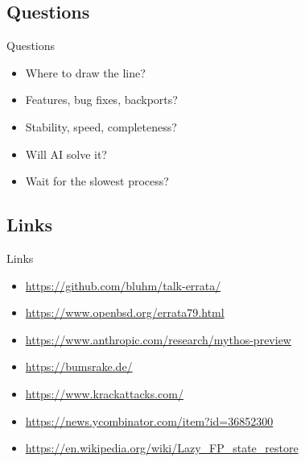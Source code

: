 \documentclass[14pt,aspectratio=169]{beamer}
\begin{document}
\subsection{Questions}
\begin{frame}{Questions}
\begin{itemize}
\item Where to draw the line?
\item Features, bug fixes, backports?
\item Stability, speed, completeness?
\item Will AI solve it?
\item Wait for the slowest process?
\end{itemize}
\end{frame}

\subsection{Links}
\begin{frame}{Links}
\footnotesize
\begin{itemize}
\item \url{https://github.com/bluhm/talk-errata/}
\item \url{https://www.openbsd.org/errata79.html}
\item \url{https://www.anthropic.com/research/mythos-preview}
\item \url{https://bumsrake.de/}
\item \url{https://www.krackattacks.com/}
\item \url{https://news.ycombinator.com/item?id=36852300}
\item \url{https://en.wikipedia.org/wiki/Lazy_FP_state_restore}
\end{itemize}
\end{frame}
\end{document}
